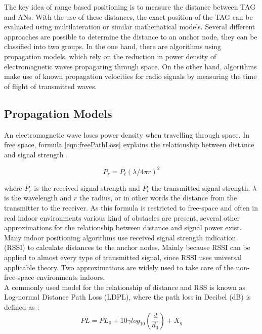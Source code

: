 The key idea of range based positioning is to measure the distance between TAG and ANs. With the use of these distances, the exact position of the TAG can be evaluated using multilateration or similar mathematical models. Several different approaches are possible to determine the distance to an anchor node, they can be classified into two groups. In the one hand, there are algorithms using propagation models, which rely on the reduction in power density of electromagnetic waves propagating through space. On the other hand, algorithms make use of known propagation velocities for radio signals  by measuring the time of flight of transmitted waves. 

\subsection{Propagation Models}
An electromagnetic wave loses power density when travelling through space. In free space, formula \ref{eqn:freePathLoss} explains the relationship between distance and signal strength \cite{VorlesungCN}.

\begin{equation}
P_{r} = P_{t} (\lambda/4\pi r)^2
\label{eqn:freePathLoss}
\end{equation}

where $P_{r}$ is the received signal strength and $P_{t}$ the transmitted signal strength. $\lambda$ is the wavelength and $r$ the radius, or in other words the distance from the transmitter to the receiver. As this formula is restricted to free-space and often in real indoor environments various kind of obstacles are present, several other approximations for the relationship between distance and signal power exist. Many indoor positioning algorithms use received signal strength indication (RSSI) to calculate distances to the anchor nodes. Mainly because RSSI can be applied to almost every type of transmitted signal, since RSSI uses universal applicable theory. Two approximations are widely used to take care of the non-free-space environments indoors.\\
\noindent\hspace*{5mm}%
A commonly used model for the relationship of distance and RSS is known as Log-normal Distance Path Loss (LDPL), where the path loss in Decibel (dB) is defined as \cite{Sarkar}:
\begin{equation}
PL = PL_{0} +10 \gamma log_{10} (\frac{d}{d_{0}}) + X_{g}
\label{eqn:LDPL}
\end{equation}

